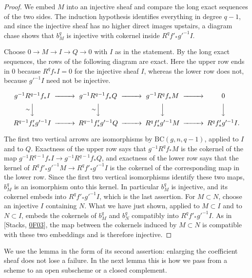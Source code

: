 \documentclass[11pt]{article}
\begin{document}
\begin{proof}[{Proof}]\label{bp18}%
We embed \(M\) into an injective sheaf and compare the long exact sequences of the two sides. The induction hypothesis identifies everything in degree \(q-1\), and since the injective sheaf has no higher direct images upstairs, a diagram chase shows that \(b^q_M\) is injective with cokernel inside \(R^qf'_*g'^{-1}I\).

Choose \(0\to M\to I\to Q\to0\) with \(I\) as in the statement. By the long exact sequences, the rows of the following diagram are exact. Here the upper row ends in \(0\) because \(R^qf_*I=0\) for the injective sheaf \(I\), whereas the lower row does not, because \(g'^{-1}I\) need not be injective.

\[
\begin{CD}
g^{-1}R^{q-1}f_*I @>>> g^{-1}R^{q-1}f_*Q
@>>> g^{-1}R^qf_*M @>>>0\\
@V{\sim}VV @V{\sim}VV @VVV @VVV\\
R^{q-1}f'_*g'^{-1}I @>>> R^{q-1}f'_*g'^{-1}Q
@>>>R^qf'_*g'^{-1}M @>>>R^qf'_*g'^{-1}I.
\end{CD}
\]

The first two vertical arrows are isomorphisms by \(\mathrm{BC}(g,n,q-1)\), applied to \(I\) and to \(Q\). Exactness of the upper row says that \(g^{-1}R^qf_*M\) is the cokernel of the map \(g^{-1}R^{q-1}f_*I\to g^{-1}R^{q-1}f_*Q\), and exactness of the lower row says that the kernel of \(R^qf'_*g'^{-1}M\to R^qf'_*g'^{-1}I\) is the cokernel of the corresponding map in the lower row. Since the first two vertical isomorphisms identify these two maps, \(b_M^q\) is an isomorphism onto this kernel. In particular \(b^q_M\) is injective, and its cokernel embeds into \(R^qf'_*g'^{-1}I\), which is the last assertion. For \(M\subset N\), choose an injective \(I\) containing \(N\). What we have just shown, applied to \(M\subset I\) and to \(N\subset I\), embeds the cokernels of \(b_M^q\) and \(b_N^q\) compatibly into \(R^qf'_*g'^{-1}I\). As in [Stacks, \href{https://stacks.math.columbia.edu/tag/0F03}{0F03}], the map between the cokernels induced by \(M\subset N\) is compatible with these two embeddings and is therefore injective.
\end{proof}

\label{bp19}%
We use the lemma in the form of its second assertion: enlarging the coefficient sheaf does not lose a failure. In the next lemma this is how we pass from a scheme to an open subscheme or a closed complement.
\end{document}

